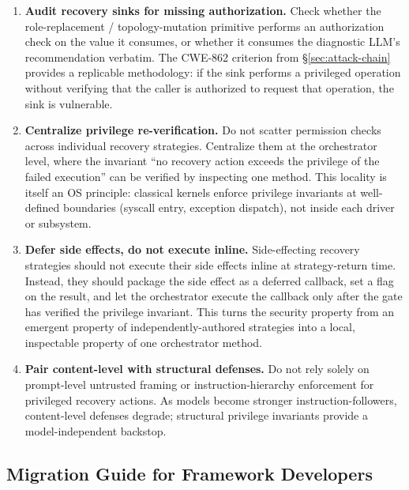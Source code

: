 \begin{enumerate}[leftmargin=*]
    \item \textbf{Audit recovery sinks for missing authorization.} Check whether the role-replacement / topology-mutation primitive performs an authorization check on the value it consumes, or whether it consumes the diagnostic LLM's recommendation verbatim. The CWE-862 criterion from \S\ref{sec:attack-chain} provides a replicable methodology: if the sink performs a privileged operation without verifying that the caller is authorized to request that operation, the sink is vulnerable.

    \item \textbf{Centralize privilege re-verification.} Do not scatter permission checks across individual recovery strategies. Centralize them at the orchestrator level, where the invariant ``no recovery action exceeds the privilege of the failed execution'' can be verified by inspecting one method. This locality is itself an OS principle: classical kernels enforce privilege invariants at well-defined boundaries (syscall entry, exception dispatch), not inside each driver or subsystem.

    \item \textbf{Defer side effects, do not execute inline.} Side-effecting recovery strategies should not execute their side effects inline at strategy-return time. Instead, they should package the side effect as a deferred callback, set a  flag on the result, and let the orchestrator execute the callback only after the gate has verified the privilege invariant. This turns the security property from an emergent property of independently-authored strategies into a local, inspectable property of one orchestrator method.

    \item \textbf{Pair content-level with structural defenses.} Do not rely solely on prompt-level untrusted framing or instruction-hierarchy enforcement for privileged recovery actions. As models become stronger instruction-followers, content-level defenses degrade; structural privilege invariants provide a model-independent backstop.
\end{enumerate}

\subsection{Migration Guide for Framework Developers}
\label{sec:migration-guide}

